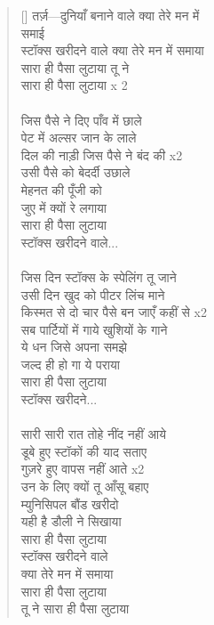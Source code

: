 \begin{verse}[\versewidth]\texthindi{
तर्ज़—दुनियाँ बनाने वाले क्या तेरे मन में\\
समाई\\
स्टॉक्स खरीदने वाले क्या तेरे मन में समाया\\
सारा ही पैसा लुटाया तू ने\\
सारा ही पैसा लुटाया x 2\\
\\
जिस पैसे ने दिए पाँव में छाले\\
पेट में अल्सर जान के लाले\\
दिल की नाड़ी जिस पैसे ने बंद की x2\\
उसी पैसे को बेदर्दी उछाले\\
मेहनत की पूँजी को\\
जुए में क्यों रे लगाया\\
सारा ही पैसा लुटाया\\
स्टॉक्स खरीदने वाले...\\
\\
जिस दिन स्टॉक्स के स्पेलिंग तू जाने\\
उसी दिन खुद को पीटर लिंच माने\\
किस्मत से दो चार पैसे बन जाएँ कहीं से x2\\
सब पार्टियों में गाये खुशियों के गाने\\
ये धन जिसे अपना समझे\\
जल्द ही हो गा ये पराया\\
सारा ही पैसा लुटाया\\
स्टॉक्स खरीदने...\\
\\
सारी सारी रात तोहे नींद नहीं आये\\
डूबे हुए स्टॉकों की याद सताए\\
गुज़रे हुए वापस नहीं आते x2\\
उन के लिए क्यों तू आँसू बहाए\\
म्युनिसिपल बौंड खरीदो\\
यही है डौली ने सिखाया\\
सारा ही पैसा लुटाया\\
स्टॉक्स खरीदने वाले\\
क्या तेरे मन में समाया\\
सारा ही पैसा लुटाया\\
तू ने सारा ही पैसा लुटाया
}\end{verse} 

